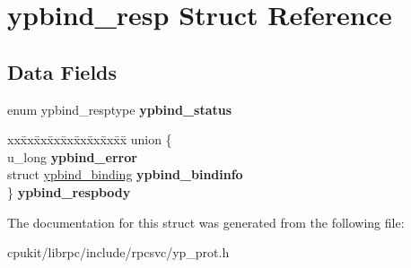 \hypertarget{structypbind__resp}{}\section{ypbind\+\_\+resp Struct Reference}
\label{structypbind__resp}
\subsection*{Data Fields}
\begin{DoxyCompactItemize}
\item 
\mbox{\label{structypbind__resp_a229357be7091b1c741050af23ead4310}} 
enum ypbind\+\_\+resptype {\bfseries ypbind\+\_\+status}
\item 
\mbox{\label{structypbind__resp_a778efe341388a62bb7826ecc36fbc449}} 
\begin{tabbing}
xx\=xx\=xx\=xx\=xx\=xx\=xx\=xx\=xx\=\kill
union \{\\
\>u\_long {\bfseries ypbind\_error}\\
\>struct \mbox{\hyperlink{structypbind__binding}{ypbind\_binding}} {\bfseries ypbind\_bindinfo}\\
\} {\bfseries ypbind\_respbody}\\

\end{tabbing}\end{DoxyCompactItemize}


The documentation for this struct was generated from the following file\+:\begin{DoxyCompactItemize}
\item 
cpukit/librpc/include/rpcsvc/yp\+\_\+prot.\+h\end{DoxyCompactItemize}
